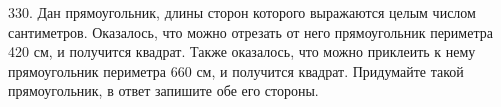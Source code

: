 330. Дан прямоугольник, длины сторон которого выражаются целым числом сантиметров. Оказалось, что можно отрезать от него прямоугольник периметра 420 см, и получится квадрат. Также оказалось, что можно приклеить к нему прямоугольник периметра 660 см, и получится квадрат. Придумайте такой прямоугольник, в ответ запишите обе его стороны.\\
